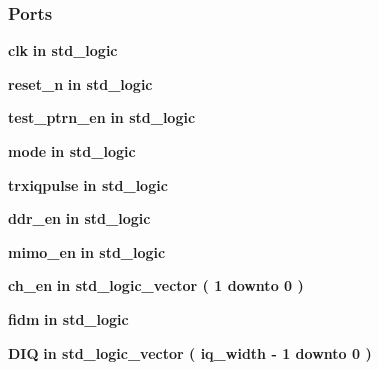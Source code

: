 \subsubsection*{Ports}
 \begin{DoxyCompactItemize}
\item 
{\bf clk}  {\bfseries {\bfseries \textcolor{keywordflow}{in}\textcolor{vhdlchar}{ }}} {\bfseries \textcolor{comment}{std\+\_\+logic}\textcolor{vhdlchar}{ }} 
\item 
{\bf reset\+\_\+n}  {\bfseries {\bfseries \textcolor{keywordflow}{in}\textcolor{vhdlchar}{ }}} {\bfseries \textcolor{comment}{std\+\_\+logic}\textcolor{vhdlchar}{ }} 
\item 
{\bf test\+\_\+ptrn\+\_\+en}  {\bfseries {\bfseries \textcolor{keywordflow}{in}\textcolor{vhdlchar}{ }}} {\bfseries \textcolor{comment}{std\+\_\+logic}\textcolor{vhdlchar}{ }} 
\item 
{\bf mode}  {\bfseries {\bfseries \textcolor{keywordflow}{in}\textcolor{vhdlchar}{ }}} {\bfseries \textcolor{comment}{std\+\_\+logic}\textcolor{vhdlchar}{ }} 
\item 
{\bf trxiqpulse}  {\bfseries {\bfseries \textcolor{keywordflow}{in}\textcolor{vhdlchar}{ }}} {\bfseries \textcolor{comment}{std\+\_\+logic}\textcolor{vhdlchar}{ }} 
\item 
{\bf ddr\+\_\+en}  {\bfseries {\bfseries \textcolor{keywordflow}{in}\textcolor{vhdlchar}{ }}} {\bfseries \textcolor{comment}{std\+\_\+logic}\textcolor{vhdlchar}{ }} 
\item 
{\bf mimo\+\_\+en}  {\bfseries {\bfseries \textcolor{keywordflow}{in}\textcolor{vhdlchar}{ }}} {\bfseries \textcolor{comment}{std\+\_\+logic}\textcolor{vhdlchar}{ }} 
\item 
{\bf ch\+\_\+en}  {\bfseries {\bfseries \textcolor{keywordflow}{in}\textcolor{vhdlchar}{ }}} {\bfseries \textcolor{comment}{std\+\_\+logic\+\_\+vector}\textcolor{vhdlchar}{ }\textcolor{vhdlchar}{(}\textcolor{vhdlchar}{ }\textcolor{vhdlchar}{ } \textcolor{vhdldigit}{1} \textcolor{vhdlchar}{ }\textcolor{keywordflow}{downto}\textcolor{vhdlchar}{ }\textcolor{vhdlchar}{ } \textcolor{vhdldigit}{0} \textcolor{vhdlchar}{ }\textcolor{vhdlchar}{)}\textcolor{vhdlchar}{ }} 
\item 
{\bf fidm}  {\bfseries {\bfseries \textcolor{keywordflow}{in}\textcolor{vhdlchar}{ }}} {\bfseries \textcolor{comment}{std\+\_\+logic}\textcolor{vhdlchar}{ }} 
\item 
{\bf D\+IQ}  {\bfseries {\bfseries \textcolor{keywordflow}{in}\textcolor{vhdlchar}{ }}} {\bfseries \textcolor{comment}{std\+\_\+logic\+\_\+vector}\textcolor{vhdlchar}{ }\textcolor{vhdlchar}{(}\textcolor{vhdlchar}{ }\textcolor{vhdlchar}{ }\textcolor{vhdlchar}{ }\textcolor{vhdlchar}{ }{\bfseries {\bf iq\+\_\+width}} \textcolor{vhdlchar}{-\/}\textcolor{vhdlchar}{ } \textcolor{vhdldigit}{1} \textcolor{vhdlchar}{ }\textcolor{keywordflow}{downto}\textcolor{vhdlchar}{ }\textcolor{vhdlchar}{ } \textcolor{vhdldigit}{0} \textcolor{vhdlchar}{ }\textcolor{vhdlchar}{)}\textcolor{vhdlchar}{ }} 

\end{DoxyCompactItemize}
